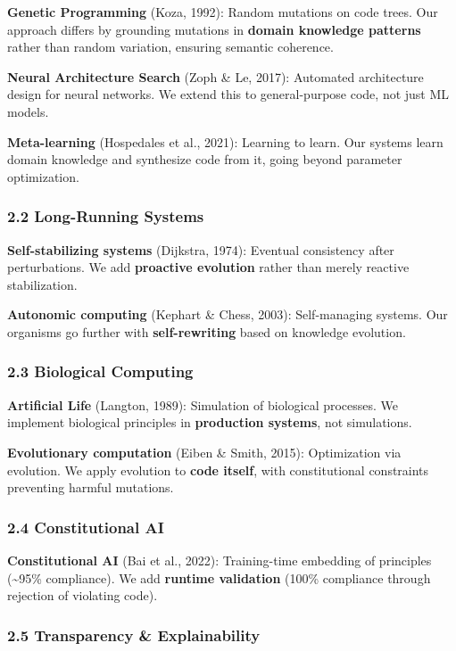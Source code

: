 \documentclass[
]{article}
\begin{document}
\textbf{Genetic Programming} (Koza, 1992): Random mutations on code
trees. Our approach differs by grounding mutations in \textbf{domain
knowledge patterns} rather than random variation, ensuring semantic
coherence.

\textbf{Neural Architecture Search} (Zoph \& Le, 2017): Automated
architecture design for neural networks. We extend this to
general-purpose code, not just ML models.

\textbf{Meta-learning} (Hospedales et al., 2021): Learning to learn. Our
systems learn domain knowledge and synthesize code from it, going beyond
parameter optimization.

\subsubsection{2.2 Long-Running Systems}\label{long-running-systems}

\textbf{Self-stabilizing systems} (Dijkstra, 1974): Eventual consistency
after perturbations. We add \textbf{proactive evolution} rather than
merely reactive stabilization.

\textbf{Autonomic computing} (Kephart \& Chess, 2003): Self-managing
systems. Our organisms go further with \textbf{self-rewriting} based on
knowledge evolution.

\subsubsection{2.3 Biological Computing}\label{biological-computing}

\textbf{Artificial Life} (Langton, 1989): Simulation of biological
processes. We implement biological principles in \textbf{production
systems}, not simulations.

\textbf{Evolutionary computation} (Eiben \& Smith, 2015): Optimization
via evolution. We apply evolution to \textbf{code itself}, with
constitutional constraints preventing harmful mutations.

\subsubsection{2.4 Constitutional AI}\label{constitutional-ai}

\textbf{Constitutional AI} (Bai et al., 2022): Training-time embedding
of principles (\textasciitilde95\% compliance). We add \textbf{runtime
validation} (100\% compliance through rejection of violating code).

\subsubsection{2.5 Transparency \&
Explainability}\label{transparency-explainability}
\end{document}
